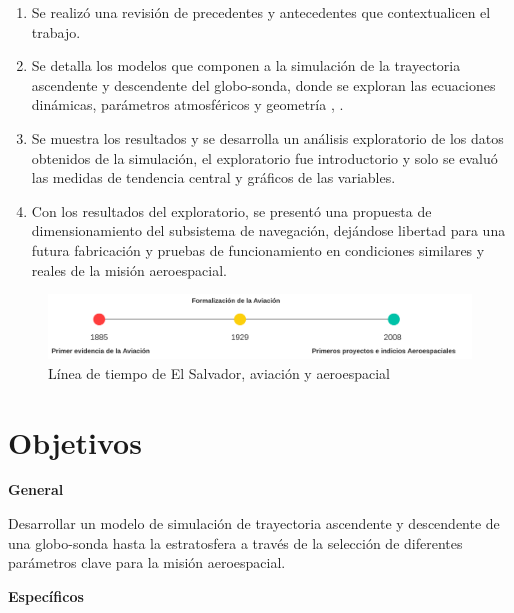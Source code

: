 \begin{enumerate}
    \item  Se realizó una revisión de precedentes y antecedentes que contextualicen el trabajo.
    \item Se detalla los modelos que componen a la simulación de la trayectoria ascendente y descendente del globo-sonda, donde se exploran las ecuaciones dinámicas, parámetros atmosféricos y geometría \cite{simulador_chino}, \cite{ascentRate_weatherBallon}. 
    \item Se muestra los resultados y se desarrolla un análisis exploratorio de los datos obtenidos de la simulación, el exploratorio fue introductorio y solo se evaluó las medidas de tendencia central y gráficos de las variables.
    \item Con los resultados del exploratorio, se presentó una propuesta de dimensionamiento del subsistema de navegación, dejándose libertad para una  futura fabricación y pruebas de funcionamiento en condiciones similares y reales de la misión aeroespacial.
\end{enumerate}

\begin{figure}[!ht]
    \centering
    \includegraphics[width=0.85\linewidth]{document/figures/01_linea del tiempo_historia.png}
    \caption{Línea de tiempo de El Salvador, aviación y aeroespacial}
    \label{fig:historia}
\end{figure}

\newpage

\section{Objetivos} \label{sct:intro:objetivos}

\vspace{1.0cm}

\textbf{General}

Desarrollar un modelo de simulación de trayectoria ascendente y descendente de una globo-sonda hasta la estratosfera a través de la selección de diferentes parámetros clave para la misión aeroespacial.

\vspace{1.5cm}

\textbf{Específicos}

